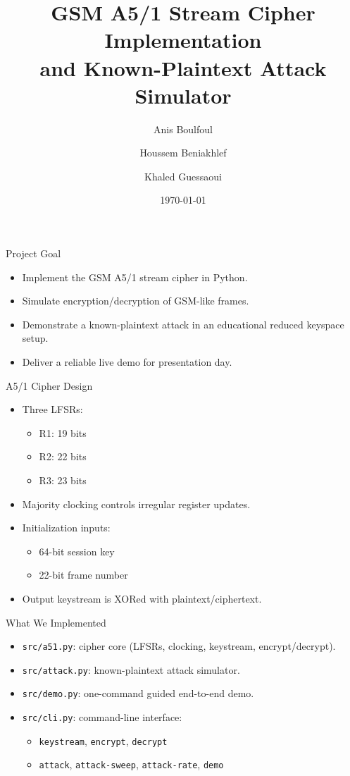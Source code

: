 \documentclass[10pt]{beamer}
\title{GSM A5/1 Stream Cipher Implementation\\and Known-Plaintext Attack Simulator}
\author{Anis Boulfoul \and Houssem Beniakhlef \and Khaled Guessaoui}
\institute{Wireless and Mobile Network Security}
\date{\today}
\begin{document}
\begin{frame}
  \titlepage
\end{frame}

\begin{frame}{Project Goal}
\begin{itemize}
  \item Implement the GSM A5/1 stream cipher in Python.
  \item Simulate encryption/decryption of GSM-like frames.
  \item Demonstrate a known-plaintext attack in an educational reduced keyspace setup.
  \item Deliver a reliable live demo for presentation day.
\end{itemize}
\end{frame}

\begin{frame}{A5/1 Cipher Design}
\begin{itemize}
  \item Three LFSRs:
  \begin{itemize}
    \item R1: 19 bits
    \item R2: 22 bits
    \item R3: 23 bits
  \end{itemize}
  \item Majority clocking controls irregular register updates.
  \item Initialization inputs:
  \begin{itemize}
    \item 64-bit session key
    \item 22-bit frame number
  \end{itemize}
  \item Output keystream is XORed with plaintext/ciphertext.
\end{itemize}
\end{frame}

\begin{frame}{What We Implemented}
\begin{itemize}
  \item \texttt{src/a51.py}: cipher core (LFSRs, clocking, keystream, encrypt/decrypt).
  \item \texttt{src/attack.py}: known-plaintext attack simulator.
  \item \texttt{src/demo.py}: one-command guided end-to-end demo.
  \item \texttt{src/cli.py}: command-line interface:
  \begin{itemize}
    \item \texttt{keystream}, \texttt{encrypt}, \texttt{decrypt}
    \item \texttt{attack}, \texttt{attack-sweep}, \texttt{attack-rate}, \texttt{demo}
  \end{itemize}
\end{itemize}
\end{frame}
\end{document}
